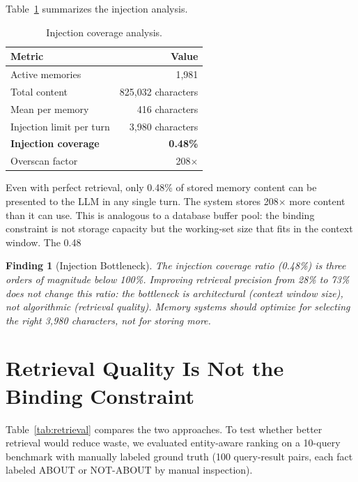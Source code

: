 \documentclass[11pt]{article}
\newtheorem{finding}{Finding}
\begin{document}
Table~\ref{tab:injection} summarizes the injection analysis.

\begin{table}[h]
\centering
\caption{Injection coverage analysis.}
\label{tab:injection}
\begin{tabular}{lr}
\toprule
Metric & Value \\
\midrule
Active memories & 1,981 \\
Total content & 825,032 characters \\
Mean per memory & 416 characters \\
Injection limit per turn & 3,980 characters \\
\textbf{Injection coverage} & \textbf{0.48\%} \\
Overscan factor & 208$\times$ \\
\bottomrule
\end{tabular}
\end{table}

Even with perfect retrieval, only 0.48\% of stored memory content can be presented to the LLM in any single turn. The system stores 208$\times$ more content than it can use. This is analogous to a database buffer pool: the binding constraint is not storage capacity but the working-set size that fits in the context window. The 0.48%

\begin{finding}[Injection Bottleneck]
The injection coverage ratio (0.48\%) is three orders of magnitude below 100\%. Improving retrieval precision from 28\% to 73\% does not change this ratio: the bottleneck is architectural (context window size), not algorithmic (retrieval quality). Memory systems should optimize for \emph{selecting the right 3,980 characters}, not for storing more.
\end{finding}

\section{Retrieval Quality Is Not the Binding Constraint}

Table~\ref{tab:retrieval} compares the two approaches. To test whether better retrieval would reduce waste, we evaluated entity-aware ranking on a 10-query benchmark with manually labeled ground truth (100 query-result pairs, each fact labeled ABOUT or NOT-ABOUT by manual inspection).
\end{document}
